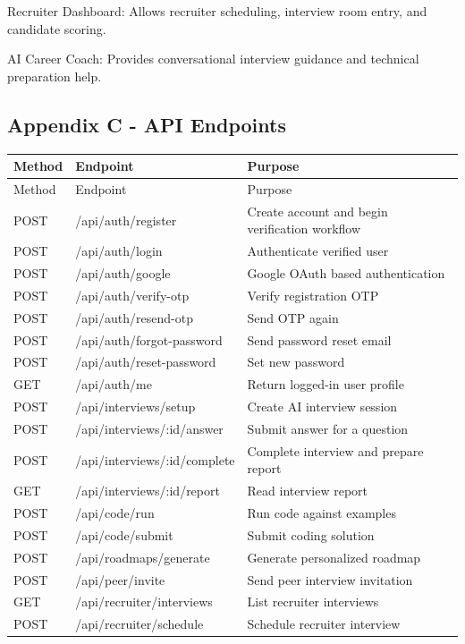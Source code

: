 \documentclass[12pt,a4paper]{report}
\begin{document}
Recruiter Dashboard: Allows recruiter scheduling, interview room entry, and candidate scoring.


AI Career Coach: Provides conversational interview guidance and technical preparation help.


\subsection{Appendix C - API Endpoints}

\begin{longtable}{|>{\raggedright\arraybackslash}p{}|>{\raggedright\arraybackslash}p{}|>{\raggedright\arraybackslash}p{}|}
\hline
Method & Endpoint & Purpose \\
\hline
\endfirsthead
\hline
Method & Endpoint & Purpose \\
\hline
\endhead
POST & /api/auth/register & Create account and begin verification workflow \\
\hline
POST & /api/auth/login & Authenticate verified user \\
\hline
POST & /api/auth/google & Google OAuth based authentication \\
\hline
POST & /api/auth/verify-otp & Verify registration OTP \\
\hline
POST & /api/auth/resend-otp & Send OTP again \\
\hline
POST & /api/auth/forgot-password & Send password reset email \\
\hline
POST & /api/auth/reset-password & Set new password \\
\hline
GET & /api/auth/me & Return logged-in user profile \\
\hline
POST & /api/interviews/setup & Create AI interview session \\
\hline
POST & /api/interviews/:id/answer & Submit answer for a question \\
\hline
POST & /api/interviews/:id/complete & Complete interview and prepare report \\
\hline
GET & /api/interviews/:id/report & Read interview report \\
\hline
POST & /api/code/run & Run code against examples \\
\hline
POST & /api/code/submit & Submit coding solution \\
\hline
POST & /api/roadmaps/generate & Generate personalized roadmap \\
\hline
POST & /api/peer/invite & Send peer interview invitation \\
\hline
GET & /api/recruiter/interviews & List recruiter interviews \\
\hline
POST & /api/recruiter/schedule & Schedule recruiter interview \\
\hline
\end{longtable}
\end{document}
